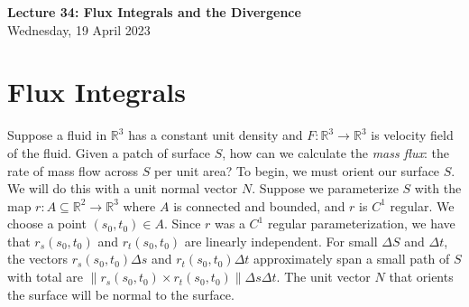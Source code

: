 \documentclass[11pt]{article}
\theoremstyle{definition}
\newcommand{\R}{\mathbb{R}}                      %
\begin{document}
\thispagestyle{empty}

\begin{center}
{\LARGE \bf Lecture 34: Flux Integrals and the Divergence}\\
{\large Wednesday, 19 April 2023}\\
\end{center}

\section{Flux Integrals}
Suppose a fluid in $\R^3$ has a constant unit density and $F:\R^3\to \R^3$ is velocity field of the fluid. Given a patch of surface $S$, how can we calculate the \textit{mass flux}: the rate of mass flow across $S$ per unit area? To begin, we must orient our surface $S$. We will do this with a unit normal vector $N$. Suppose we parameterize $S$ with the map $r:A\subseteq \R^2\to\R^3$ where $A$ is connected and bounded, and $r$ is $C^1$ regular. We choose a point $(s_0,t_0)\in A$. Since $r$ was a $C^1$ regular parameterization, we have that $r_s(s_0,t_0)$ and $r_t(s_0,t_0)$ are linearly independent. For small $\Delta S$ and $\Delta t$, the vectors $r_s(s_0,t_0)\Delta s$ and $r_t(s_0,t_0)\Delta t$ approximately span a small path of $S$ with total are $\|r_s(s_0,t_0)\times r_t(s_0,t_0)\|\Delta s \Delta t$. The unit vector $N$ that orients the surface will be normal to the surface.
\end{document}
